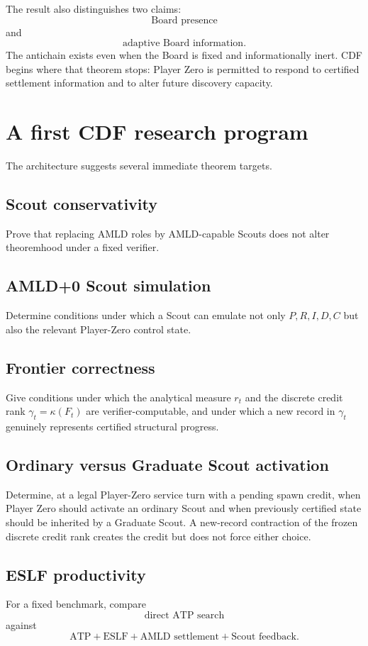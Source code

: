 \documentclass[11pt]{article}
\theoremstyle{definition}
\begin{document}
The result also distinguishes two claims:
\[
\text{Board presence}
\]
and
\[
\text{adaptive Board information}.
\]
The antichain exists even when the Board is fixed and informationally inert. CDF begins where that theorem stops: Player Zero is permitted to respond to certified settlement information and to alter future discovery capacity.

\section{A first CDF research program}

The architecture suggests several immediate theorem targets.

\subsection{Scout conservativity}
Prove that replacing AMLD roles by AMLD-capable Scouts does not alter theoremhood under a fixed verifier.

\subsection{AMLD+0 Scout simulation}
Determine conditions under which a Scout can emulate not only $P,R,I,D,C$ but also the relevant Player-Zero control state.

\subsection{Frontier correctness}
Give conditions under which the analytical measure $r_t$ and the discrete credit rank $\gamma_t=\kappa(F_t)$ are verifier-computable, and under which a new record in $\gamma_t$ genuinely represents certified structural progress.

\subsection{Ordinary versus Graduate Scout activation}
Determine, at a legal Player-Zero service turn with a pending spawn credit, when Player Zero should activate an ordinary Scout and when previously certified state should be inherited by a Graduate Scout. A new-record contraction of the frozen discrete credit rank creates the credit but does not force either choice.

\subsection{ESLF productivity}
For a fixed benchmark, compare
\[
\text{direct ATP search}
\]
against
\[
\text{ATP}+\text{ESLF}+\text{AMLD settlement}+\text{Scout feedback}.
\]
\end{document}
